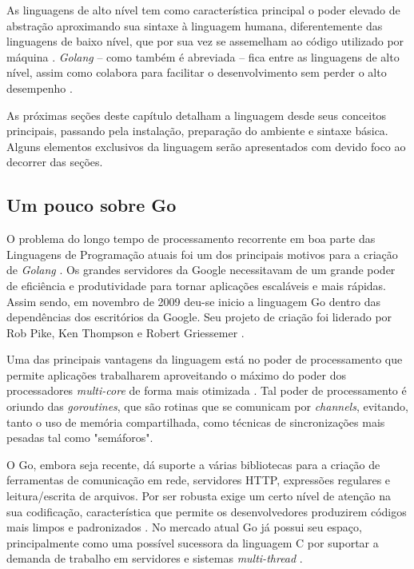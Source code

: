 \documentclass{SBCbookchapter}
\begin{document}
As linguagens de alto nível tem como característica principal o poder elevado de abstração aproximando sua sintaxe à linguagem humana, diferentemente das linguagens de baixo nível, que por sua vez se assemelham ao código utilizado por máquina \cite{se}. \textit{Golang} -- como também é abreviada -- fica entre as linguagens de alto nível, assim como colabora para facilitar o desenvolvimento sem perder o alto desempenho \cite{fi}. %

As próximas seções deste capítulo detalham a linguagem desde seus conceitos principais, passando pela instalação, preparação do ambiente e sintaxe básica. Alguns elementos exclusivos da linguagem serão apresentados com devido foco ao decorrer das seções.

\subsection{Um pouco sobre Go}

O problema do longo tempo de processamento recorrente em boa parte das Linguagens de Programação atuais foi um dos principais motivos para a criação de \textit{Golang} \cite{marins}. Os grandes servidores da Google necessitavam de um grande poder de eficiência e produtividade para tornar aplicações escaláveis e mais rápidas. Assim sendo, em novembro de 2009 deu-se inicio a linguagem  Go dentro das dependências dos escritórios da Google. Seu projeto de criação foi liderado por Rob Pike, Ken Thompson e Robert Griessemer \cite{patel}.

Uma das principais vantagens da linguagem está no poder de processamento que permite aplicações trabalharem aproveitando o máximo do poder dos processadores \textit{multi-core} de forma mais otimizada \cite{young}. %
Tal poder de processamento é oriundo das \textit{goroutines}, que são rotinas que se comunicam por \textit{channels}, evitando, tanto o uso de memória compartilhada, como técnicas de sincronizações mais pesadas tal como "semáforos".


O Go, embora seja recente, dá suporte a várias bibliotecas para a criação de ferramentas de comunicação em rede, servidores HTTP, expressões regulares e leitura/escrita de arquivos. Por ser robusta exige um certo nível de atenção na sua codificação, característica que permite os desenvolvedores produzirem códigos mais limpos e padronizados \cite{doxsey}. No mercado atual Go já possui seu espaço, principalmente como uma possível sucessora da linguagem C por suportar a demanda de trabalho em servidores e sistemas \textit{multi-thread} \cite{codal}. %
\end{document}
